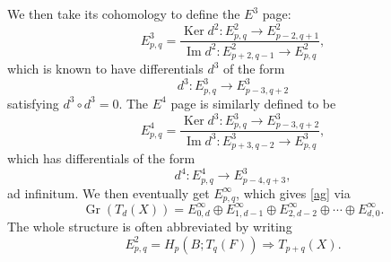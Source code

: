 \documentclass[12pt]{article}
\numberwithin{equation}{section}
\numberwithin{figure}{section}
\theoremstyle{remark}
\def\Gr{\mathop{\mathrm{Gr}}}
\def\Ker{\mathop{\mathrm{Ker}}}
\def\Im{\mathop{\mathrm{Im}}}
\begin{document}
We then take its cohomology to define the $E^3$ page: \begin{equation}
E^3_{p,q}=\frac{\Ker d^2\colon E^2_{p,q}\to E^2_{p-2,q+1}}
{\Im d^2\colon E^2_{p+2,q-1} \to E^2_{p,q}} ,
\end{equation}
which is known to have differentials $d^3$ of the form \begin{equation}
d^3\colon E^3_{p,q} \to E^3_{p-3,q+2}
\end{equation} satisfying $d^3\circ d^3=0$.
The $E^4$ page is similarly defined to be \begin{equation}
E^4_{p,q}=\frac{\Ker d^3\colon E^3_{p,q}\to E^3_{p-3,q+2}}
{\Im d^3\colon E^3_{p+3,q-2} \to E^3_{p,q}} ,
\end{equation} which has differentials of the form \begin{equation}
d^4\colon E^4_{p,q} \to E^3_{p-4,q+3},
\end{equation} ad infinitum.
We then eventually get $E^\infty_{p,q}$, which gives \eqref{ag} via \begin{equation}
\Gr(T_d(X))= E^\infty_{0,d}\oplus E^\infty_{1,d-1} \oplus E^\infty_{2,d-2} \oplus \cdots \oplus E^\infty_{d,0}.
\end{equation}
The whole structure is often abbreviated by writing \begin{equation}
E^2_{p,q} = H_p(B;T_q(F)) \Rightarrow T_{p+q}(X).
\end{equation}
\end{document}
